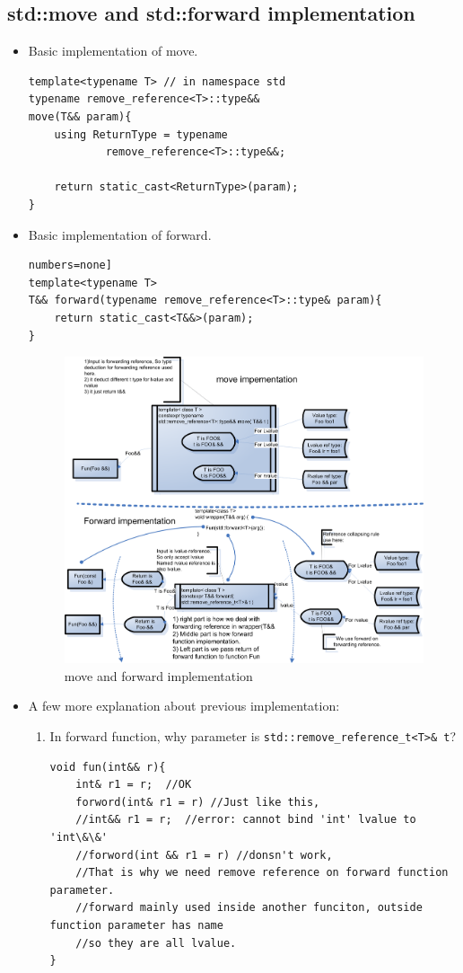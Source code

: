 \documentclass[a4paper,11pt,twoside]{book}
\begin{document}
\subsection{std::move and std::forward implementation}
\begin{itemize}
	\item Basic implementation of move.
\begin{lstlisting}[numbers=none]
template<typename T> // in namespace std
typename remove_reference<T>::type&&
move(T&& param){
	using ReturnType = typename 
			remove_reference<T>::type&&; 
			
	return static_cast<ReturnType>(param);
}
\end{lstlisting}
	
	\item Basic implementation of forward.
\begin{lstlisting}numbers=none]
template<typename T>
T&& forward(typename remove_reference<T>::type& param){
	return static_cast<T&&>(param);
}
\end{lstlisting}

	\begin{figure}[h]
	\centering
	\includegraphics[width=0.85\linewidth]{pics/rvalue_ref.png}
	\caption{move and forward implementation}
	\label{fig:rvalueref}
\end{figure}

    \item A few more explanation about previous implementation:
    \begin{enumerate}
        \item In forward function, why parameter is \texttt{std::remove\_reference\_t<T>\& t}?
\begin{lstlisting}
void fun(int&& r){
	int& r1 = r;  //OK
    forword(int& r1 = r) //Just like this, 
    //int&& r1 = r;  //error: cannot bind 'int' lvalue to 'int\&\&'
    //forword(int && r1 = r) //donsn't work, 
    //That is why we need remove reference on forward function parameter.
    //forward mainly used inside another funciton, outside function parameter has name
    //so they are all lvalue. 
}


\end{lstlisting}
\end{enumerate}
\end{itemize}
\end{document}
